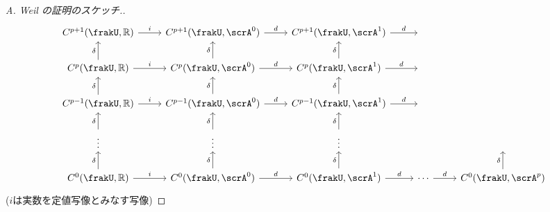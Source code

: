 \documentclass[report]{jlreq}
\begin{document}
\begin{proof}[A. Weil の証明のスケッチ.]
    \begin{equation}
        \begin{tikzcd}
            C^{p + 1}(\frakU, \R)
                \ar{r}{i}
                & C^{p + 1}(\frakU, \scrA^0)
                \ar{r}{d}
                & C^{p + 1}(\frakU, \scrA^1)
                \ar{r}{d}
                & ~ \\
            C^{p}(\frakU, \R)
                \ar{r}{i} \ar{u}{\delta}
                & C^{p}(\frakU, \scrA^0)
                \ar{r}{d} \ar{u}{\delta}
                & C^{p}(\frakU, \scrA^1)
                \ar{r}{d} \ar{u}{\delta}
                & ~ \\
            C^{p - 1}(\frakU, \R)
                \ar{r}{i} \ar{u}{\delta}
                & C^{p - 1}(\frakU, \scrA^0)
                \ar{r}{d} \ar{u}{\delta}
                & C^{p - 1}(\frakU, \scrA^1)
                \ar{r}{d} \ar{u}{\delta}
                & ~ \\
            \vdots
                \ar{u}{\delta}
                & \vdots
                \ar{u}{\delta}
                & \vdots
                \ar{u}{\delta}
                & ~
                & ~ \\
            C^{0}(\frakU, \R)
                \ar{r}{i} \ar{u}{\delta}
                & C^{0}(\frakU, \scrA^0)
                \ar{r}{d} \ar{u}{\delta}
                & C^{0}(\frakU, \scrA^1)
                \ar{r}{d} \ar{u}{\delta}
                & \cdots
                \ar{r}{d}
                & C^{0}(\frakU, \scrA^{p})
                \ar{u}{\delta}
        \end{tikzcd}
    \end{equation}
    ($i$は実数を定値写像とみなす写像)


\end{proof}
\end{document}
